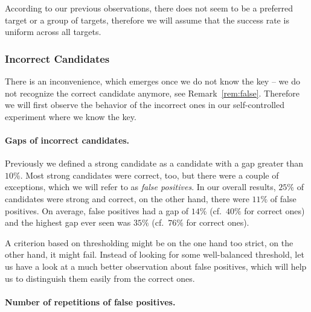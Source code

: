 	\begin{remark}
	\label{rem:uniform}
		According to our previous observations, there does not seem to be a preferred target or a group of targets, therefore we will assume that the success rate is uniform across all targets.
	\end{remark}

\subsubsection{Incorrect Candidates}
	
	There is an inconvenience, which emerges once we do not know the key -- we do not recognize the correct candidate anymore, see Remark~\ref{rem:false}. Therefore we will first observe the behavior of the incorrect ones in our self-controlled experiment where we know the key.
	
	\paragraph{Gaps of incorrect candidates.}
		
		Previously we defined a strong candidate as a candidate with a gap greater than $10\%$. Most strong candidates were correct, too, but there were a couple of exceptions, which we will refer to as {\em false positives}. In our overall results, $25\%$ of candidates were strong and correct, on the other hand, there were $11\%$ of false positives. On average, false positives had a gap of $14\%$ (cf.\ $40\%$ for correct ones) and the highest gap ever seen was $35\%$ (cf.\ $76\%$ for correct ones).
		
		A criterion based on thresholding might be on the one hand too strict, on the other hand, it might fail. Instead of looking for some well-balanced threshold, let us have a look at a much better observation about false positives, which will help us to distinguish them easily from the correct ones.
	
	\paragraph{Number of repetitions of false positives.}
		
